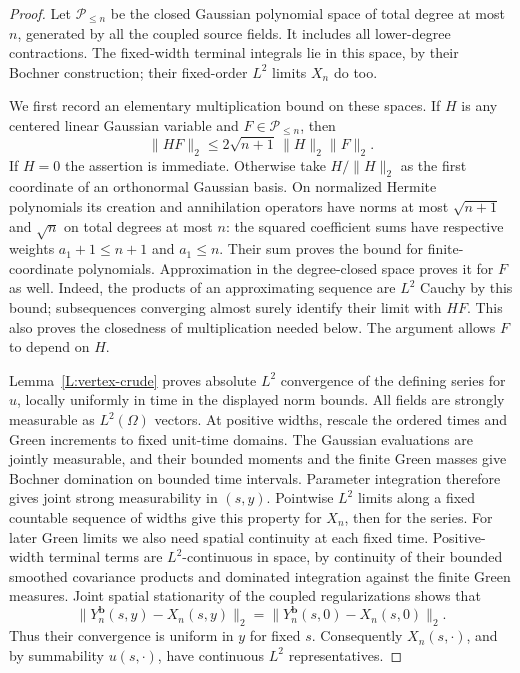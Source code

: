 \documentclass[12pt]{article}
\numberwithin{equation}{section}
\theoremstyle{definition}
\begin{document}
\begin{proof}
  Let $\mathscr P_{\le n}$ be the closed Gaussian polynomial space of
  total degree at most $n$, generated by all the coupled source fields.
  It includes all lower-degree contractions.
  The fixed-width terminal integrals lie in this space, by their
  Bochner construction; their fixed-order $L^2$ limits $X_n$ do too.

  We first record an elementary multiplication bound on these spaces.
  If $H$ is any centered linear Gaussian variable and
  $F\in\mathscr P_{\le n}$, then
  \begin{equation}\label{E:occupied-multiplication}
    \|HF\|_2\le2\sqrt{n+1}\,\|H\|_2\|F\|_2.
  \end{equation}
  If $H=0$ the assertion is immediate. Otherwise take $H/\|H\|_2$
  as the first coordinate of an orthonormal Gaussian basis.
  On normalized Hermite polynomials its creation and annihilation
  operators have norms at most $\sqrt{n+1}$ and $\sqrt n$ on total
  degrees at most $n$: the squared coefficient sums have respective
  weights $a_1+1\le n+1$ and $a_1\le n$.
  Their sum proves the bound for finite-coordinate polynomials.
  Approximation in the degree-closed space proves it for $F$ as well.
  Indeed, the products of an approximating sequence are $L^2$ Cauchy
  by this bound; subsequences converging almost surely identify their
  limit with $HF$. This also proves the closedness of multiplication
  needed below. The argument allows $F$ to depend on $H$.

  Lemma~\ref{L:vertex-crude} proves absolute $L^2$ convergence of the
  defining series for $u$, locally uniformly in time in the displayed
  norm bounds. All fields are strongly measurable as $L^2(\Omega)$
  vectors. At positive widths, rescale the ordered times and Green
  increments to fixed unit-time domains. The Gaussian evaluations are
  jointly measurable, and their bounded moments and the finite Green
  masses give Bochner domination on bounded time intervals. Parameter
  integration therefore gives joint strong measurability in $(s,y)$.
  Pointwise $L^2$ limits along a fixed countable sequence of widths
  give this property for $X_n$, then for the series.
  For later Green limits we also need spatial continuity at each fixed
  time. Positive-width terminal terms are $L^2$-continuous in space,
  by continuity of their bounded smoothed covariance products and
  dominated integration against the finite Green measures.
  Joint spatial stationarity of the coupled regularizations shows that
  \[
    \|Y_n^{\boldsymbol b}(s,y)-X_n(s,y)\|_2
    =\|Y_n^{\boldsymbol b}(s,0)-X_n(s,0)\|_2.
  \]
  Thus their convergence is uniform in $y$ for fixed $s$.
  Consequently $X_n(s,\cdot)$, and by summability $u(s,\cdot)$,
  have continuous $L^2$ representatives.


\end{proof}
\end{document}
